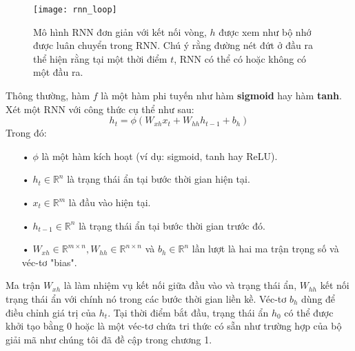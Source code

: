 \begin{figure}
	\centering
	\texttt{[image: rnn\_loop]}
	\caption[Mô hình RNN với kết nối vòng]{Mô hình RNN đơn giản với kết nối vòng, \textbf{$h$} được xem như bộ nhớ được luân chuyển trong RNN. Chú ý rằng đường nét đứt ở đầu ra thể hiện rằng tại một thời điểm $t$, RNN có thể có hoặc không có một đầu ra.}
	\label{fig_rnn_loop}
\end{figure}
Thông thường, hàm $f$ là một hàm phi tuyến như hàm \textbf{sigmoid} hay hàm \textbf{tanh}. Xét một RNN với công thức cụ thể như sau:
\begin{equation} \label{rnnWithTanh}
	h_t = \phi \left(W_{xh} x_t + W_{hh}h_{t-1} + b_h \right)
\end{equation}
Trong đó:
\begin{itemize}
	\item[•] $\phi$ là một hàm kích hoạt (ví dụ: sigmoid, tanh hay ReLU).
	\item[•] $h_{t} \in \mathbb{R}^n$ là trạng thái ẩn tại bước thời gian hiện tại.
	\item[•] $x_t \in \mathbb{R}^m$ là đầu vào hiện tại.
	\item[•] $h_{t-1} \in \mathbb{R}^n$ là trạng thái ẩn tại bước thời gian trước đó.
	\item[•] $W_{xh} \in \mathbb{R}^{m \times n}, W_{hh} \in \mathbb{R}^{n \times n}$ và $b_h \in \mathbb{R}^n$ lần lượt là hai ma trận trọng số và véc-tơ "bias".
\end{itemize}

Ma trận $W_{xh}$ là làm nhiệm vụ kết nối giữa đầu vào và trạng thái ẩn, $W_{hh}$ kết nối trạng thái ẩn với chính nó trong các bước thời gian liền kề. Véc-tơ $b_h$ dùng để điều chỉnh giá trị của $h_t$. Tại thời điểm bắt đầu, trạng thái ẩn $h_0$ có thể được khởi tạo bằng 0 hoặc là một véc-tơ chứa tri thức có sẵn như trường hợp của bộ giải mã như chúng tôi đã đề cập trong chương 1.

